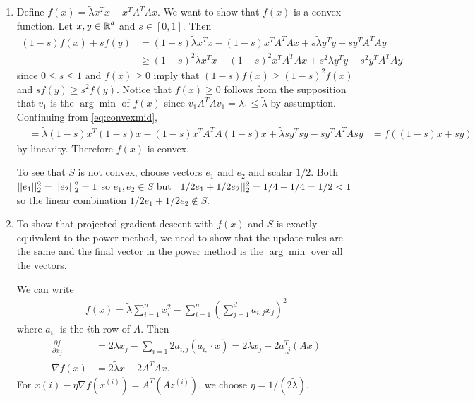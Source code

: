 \begin{enumerate}
    \item Define $f(x) = \tilde{\lambda} x^T x - x^T A^T A x$.
    We want to show that $f(x)$ is a convex function.
    Let $x,y \in \operatorname*{\mathbb{R}}^d$ and $s \in [0,1]$.
    Then
    \begin{align}
        (1-s)f(x)+sf(y) &= (1-s)\tilde{\lambda} x^T x - (1-s)x^T A^T A x
        + s\tilde{\lambda} y^T y - sy^T A^T A y \nonumber \\
        \label{eq:convexmid}
        &\geq (1-s)^2\tilde{\lambda} x^T x - (1-s)^2x^T A^T A x
        + s^2\tilde{\lambda} y^T y - s^2y^T A^T A y
    \end{align}
    since $0 \leq s \leq 1$ and $f(x) \geq 0$ imply that
    $(1-s)f(x) \geq (1-s)^2f(x)$ and $sf(y) \geq s^2f(y)$.
    Notice that $f(x) \geq 0$ follows from the supposition
    that $v_1$ is the $\arg \min$ of $f(x)$
    since $v_1 A^T A v_1 = \lambda_1 \leq \tilde{\lambda}$
    by assumption.
    Continuing from \autoref{eq:convexmid},
    \begin{align}
        &= \tilde{\lambda} (1-s) x^T (1-s) x - (1-s)x^T A^T A (1-s)x
        + \tilde{\lambda} s y^T s y - sy^T A^T A sy
        &=f((1-s)x + s y)
        \nonumber
    \end{align}
    by linearity.
    Therefore $f(x)$ is convex.

    To see that $S$ is not convex,
    choose vectors $e_1$ and $e_2$ and scalar $1/2$.
    Both $||e_1||_2^2 = ||e_2||_2^2=1$ so
    $e_1, e_2 \in S$ but
    $||1/2 e_1 +1/2 e_2||_2^2 = 1/4 + 1/4 = 1/2 < 1$
    so the linear combination $1/2 e_1 +1/2 e_2 \notin S$.

    \item To show that projected gradient descent
    with $f(x)$ and $S$ is exactly equivalent to
    the power method, we need to show that the update
    rules are the same and the final vector
    in the power method is the $\arg \min$
    over all the vectors.

    We can write
    \begin{align}
        f(x) = \tilde{\lambda}\sum_{i=1}^n x_i^2 
        - \sum_{i=1}^n \left(\sum_{j=1}^d a_{i,j} x_j \right)^2
        \nonumber
    \end{align}
    where $a_{i,}$ is the $i$th row of $A$.
    Then
    \begin{align}
        \frac{\partial f}{\partial x_j}
        &= 2 \tilde{\lambda} x_j - \sum_{i=1} 2a_{i,j} (a_{i,} \cdot x)
        = 2 \tilde{\lambda} x_j - 2a_{,j}^T (A x)
        \nonumber \\
        \label{eq:gradient}
        \nabla f(x) &=
        2 \tilde{\lambda} x - 2 A^T A x.
    \end{align}
    For $x{(i)} - \eta \nabla f(x^{(i)}) = A^T (A z^{(i)})$,
    we choose $\eta = 1/(2\tilde{\lambda})$.


\end{enumerate}
